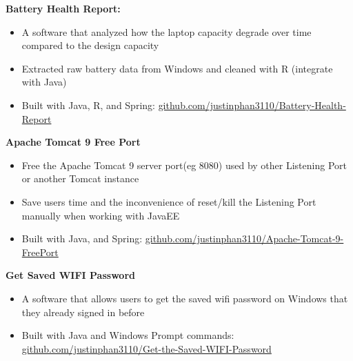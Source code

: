 \documentclass[a4paper,11pt]{article}
\begin{document}
\begin{flushleft}
	
 \textbf{Battery Health Report:} 
 \vspace{-\topsep}
 \begin{itemize}
 	\setlength{\parskip}{0pt}
 	\setlength{\itemsep}{0pt plus 1pt}
 	\item A software that analyzed how the laptop capacity degrade over time compared to the design capacity 
 	\item Extracted raw battery data from Windows and cleaned with R (integrate with Java)
 	\item Built with Java, R, and Spring: \href{https://github.com/justinphan3110/Battery-Health-Report}{github.com/justinphan3110/Battery-Health-Report}
 \end{itemize}

  \textbf{Apache Tomcat 9 Free Port} 
  \vspace{-\topsep}
  \begin{itemize}
  	\setlength{\parskip}{0pt}
  	\setlength{\itemsep}{0pt plus 1pt}
  	\item Free the Apache Tomcat 9 server port(eg 8080) used by other Listening Port or another Tomcat instance
  	\item Save users time and the inconvenience of reset/kill the Listening Port manually when working with JavaEE
  	\item Built with Java, and Spring: \href{https://github.com/justinphan3110/Apache-Tomcat-9-Free-Port}{github.com/justinphan3110/Apache-Tomcat-9-FreePort}
  \end{itemize}

  \textbf{Get Saved WIFI Password}
  \vspace{-\topsep}
  \begin{itemize}
  	\setlength{\parskip}{0pt}
  	\setlength{\itemsep}{0pt plus 1pt}
  	\item A software that allows users to get the saved wifi password on Windows that they already signed in before
  	\item Built with Java and Windows Prompt commands: \href{https://github.com/justinphan3110/Get-the-Saved-WIFI-Password}{github.com/justinphan3110/Get-the-Saved-WIFI-Password}
  \end{itemize}
\end{flushleft}
\end{document}
